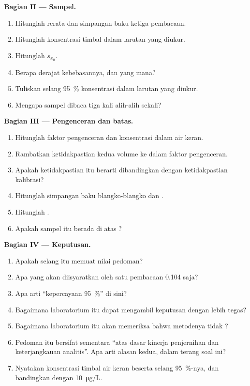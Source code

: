 \begin{problem}
\medskip
\noindent\textbf{Bagian II --- Sampel.}
\begin{enumerate}[resume]
  \item Hitunglah rerata dan simpangan baku ketiga pembacaan.
  \item Hitunglah konsentrasi timbal dalam larutan yang diukur.
  \item Hitunglah $s_{x_0}$.
  \item Berapa derajat kebebasannya, dan  yang mana?
  \item Tuliskan selang 95~\% konsentrasi dalam larutan yang diukur.
  \item Mengapa sampel dibaca tiga kali alih-alih sekali?
\end{enumerate}

\medskip
\noindent\textbf{Bagian III --- Pengenceran dan batas.}
\begin{enumerate}[resume]
  \item Hitunglah faktor pengenceran dan konsentrasi dalam air keran.
  \item Rambatkan ketidakpastian kedua volume ke dalam faktor pengenceran.
  \item Apakah ketidakpastian itu berarti dibandingkan dengan ketidakpastian kalibrasi?
  \item Hitunglah simpangan baku blangko-blangko dan .
  \item Hitunglah .
  \item Apakah sampel itu berada di atas ?
\end{enumerate}

\medskip
\noindent\textbf{Bagian IV --- Keputusan.}
\begin{enumerate}[resume]
  \item Apakah selang itu memuat nilai pedoman?
  \item Apa yang akan diisyaratkan oleh satu pembacaan 0.104 saja?
  \item Apa arti ``kepercayaan 95~\%'' di sini?
  \item Bagaimana laboratorium itu dapat mengambil keputusan dengan lebih
        tegas?
  \item Bagaimana laboratorium itu akan memeriksa bahwa metodenya tidak ?
  \item Pedoman itu bersifat sementara ``atas dasar kinerja penjernihan dan
        keterjangkauan analitis''. Apa arti alasan kedua, dalam terang soal
        ini?
  \item Nyatakan konsentrasi timbal air keran beserta selang 95~\%-nya, dan
        bandingkan dengan \qty{10}{\micro g/L}.
\end{enumerate}
\end{problem}
